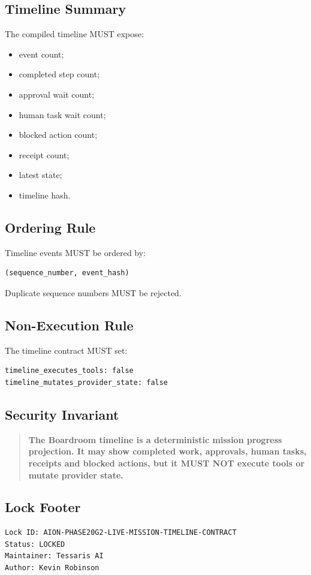 \subsection{Timeline Summary}

The compiled timeline MUST expose:

\begin{itemize}
  \item event count;
  \item completed step count;
  \item approval wait count;
  \item human task wait count;
  \item blocked action count;
  \item receipt count;
  \item latest state;
  \item timeline hash.
\end{itemize}

\subsection{Ordering Rule}

Timeline events MUST be ordered by:

\begin{verbatim}
(sequence_number, event_hash)
\end{verbatim}

Duplicate sequence numbers MUST be rejected.

\subsection{Non-Execution Rule}

The timeline contract MUST set:

\begin{verbatim}
timeline_executes_tools: false
timeline_mutates_provider_state: false
\end{verbatim}

\subsection{Security Invariant}

\begin{quote}
\textbf{The Boardroom timeline is a deterministic mission progress projection. It may show completed work, approvals, human tasks, receipts and blocked actions, but it MUST NOT execute tools or mutate provider state.}
\end{quote}

\subsection{Lock Footer}

\begin{verbatim}
Lock ID: AION-PHASE20G2-LIVE-MISSION-TIMELINE-CONTRACT
Status: LOCKED
Maintainer: Tessaris AI
Author: Kevin Robinson
\end{verbatim}
